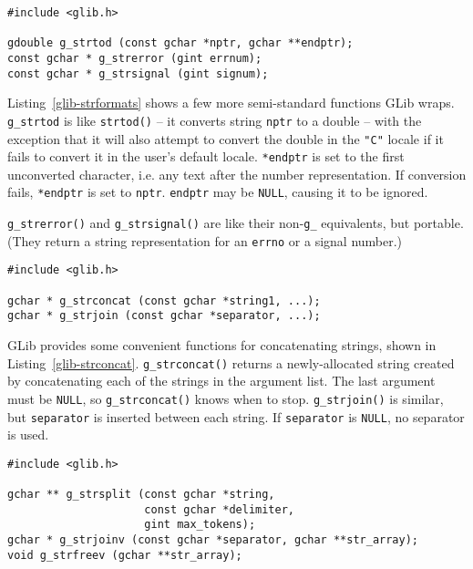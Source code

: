 \begin{lstlisting}[float, caption={String Conversions}, label=glib-strformats]
#include <glib.h>

gdouble g_strtod (const gchar *nptr, gchar **endptr);
const gchar * g_strerror (gint errnum);
const gchar * g_strsignal (gint signum);
\end{lstlisting}

Listing~\ref{glib-strformats} shows a few more semi-standard functions GLib wraps. \lstinline{g_strtod} is like \lstinline{strtod()} -- it converts string \lstinline{nptr} to a double -- with the exception that it will also attempt to convert the double in the \lstinline{"C"} locale if it fails to convert it in the user's default locale. \lstinline{*endptr} is set to the first unconverted character, i.e. any text after the number representation. If conversion fails, \lstinline{*endptr} is set to \lstinline{nptr}. \lstinline{endptr} may be \lstinline{NULL}, causing it to be ignored.

\lstinline{g_strerror()} and \lstinline{g_strsignal()} are like their non-\lstinline{g_} equivalents, but portable. (They return a string representation for an \lstinline{errno} or a signal number.)

\begin{lstlisting}[float, caption={Concatenating Strings}, label=glib-strconcat]
#include <glib.h>

gchar * g_strconcat (const gchar *string1, ...);
gchar * g_strjoin (const gchar *separator, ...);
\end{lstlisting}

GLib provides some convenient functions for concatenating strings, shown in Listing~\ref{glib-strconcat}. \lstinline{g_strconcat()} returns a newly-allocated string created by concatenating each of the strings in the argument list. The last argument must be \lstinline{NULL}, so \lstinline{g_strconcat()} knows when to stop. \lstinline{g_strjoin()} is similar, but \lstinline{separator} is inserted between each string. If \lstinline{separator} is \lstinline{NULL}, no separator is used.

\begin{lstlisting}[float, caption={Manipulating \lstinline{NULL}-terminated string vectors}, label=glib-strvector]
#include <glib.h>

gchar ** g_strsplit (const gchar *string,
                     const gchar *delimiter,
                     gint max_tokens);
gchar * g_strjoinv (const gchar *separator, gchar **str_array);
void g_strfreev (gchar **str_array);
\end{lstlisting}

